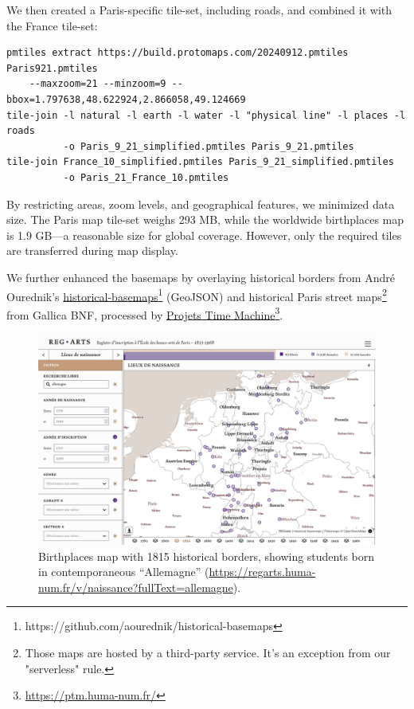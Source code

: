 \documentclass[final]{anthology-ch} %
\begin{document}
We then created a Paris-specific tile-set, including roads, and combined it with the France tile-set:
\begin{verbatim}
pmtiles extract https://build.protomaps.com/20240912.pmtiles Paris921.pmtiles
    --maxzoom=21 --minzoom=9 --bbox=1.797638,48.622924,2.866058,49.124669
tile-join -l natural -l earth -l water -l "physical line" -l places -l roads
          -o Paris_9_21_simplified.pmtiles Paris_9_21.pmtiles
tile-join France_10_simplified.pmtiles Paris_9_21_simplified.pmtiles
          -o Paris_21_France_10.pmtiles
\end{verbatim}
By restricting areas, zoom levels, and geographical features, we minimized data size. The Paris map tile-set weighs 293 MB, while the worldwide birthplaces map is 1.9 GB—a reasonable size for global coverage. However, only the required tiles are transferred during map display.

We further enhanced the basemaps by overlaying historical borders from André Ourednik’s \href{https://github.com/aourednik/historical-basemaps}{historical-basemaps}\footnote{https://github.com/aourednik/historical-basemaps} (GeoJSON) and historical Paris street maps\footnote{Those maps are hosted by a third-party service. It's an exception from our "serverless" rule.} from Gallica BNF, processed by \href{https://ptm.huma-num.fr/}{Projets Time Machine}\footnote{\url{https://ptm.huma-num.fr/}}.



\begin{figure}[t!]
  \centering
  \includegraphics[width=1\linewidth]{figures/brithplaces_map.png}
  \caption{Birthplaces map with 1815 historical borders, showing students born in contemporaneous “Allemagne” (\href{https://regarts.huma-num.fr/v/naissance?fullText=allemagne}{https://regarts.huma-num.fr/v/naissance?fullText=allemagne}).}
  \label{fig:birthplaces_map}
\end{figure}
\end{document}
